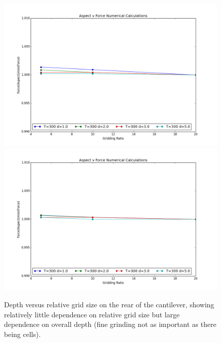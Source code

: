\documentclass[11pt]{article}
\begin{document}
\begin{figure}[h]
\centering
\includegraphics[width=5.5in]{depth_correction}
\includegraphics[width=5.5in]{depth_correction_finite}
\caption{Depth versus relative grid size on the rear of the cantilever, showing relatively little dependence on relative grid size but large dependence on overall depth (fine grinding not as important as there being cells).}\label{fig:depthCorr}
\end{figure}
\end{document}
